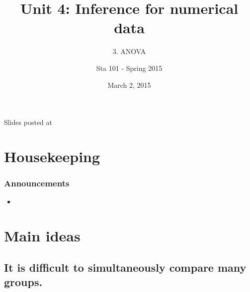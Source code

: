 \documentclass[11pt,containsverbatim,handout,xcolor=xelatex,dvipsnames,table]{beamer}
\title{Unit 4: Inference for numerical data}
\subtitle{3. ANOVA}
\author{Sta 101 - Spring 2015}
\date{March 2, 2015}
\institute{Duke University, Department of Statistical Science}
\newcommand{\mainideaA}{It is difficult to simultaneously compare many groups.}
\begin{document}


\begin{frame}[plain]

\titlepage
\vfill
{\scriptsize {} \hfill Slides posted at  \webLink{\CourseSite}{\CourseSite}}
\addtocounter{framenumber}{-1} 

\end{frame}


\section{Housekeeping}


\begin{frame}
\frametitle{Announcements}

\begin{itemize}

\item 

\end{itemize}

\end{frame}


\section{Main ideas}


\subsection{\mainideaA}
\label{mi1}

\end{document}
